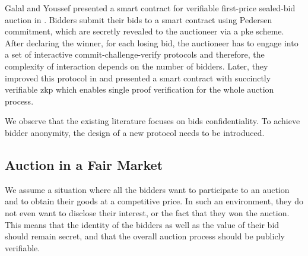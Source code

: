 
Galal and Youssef presented a smart contract for verifiable first-price sealed-bid auction in \cite{galal2018verifiable}. Bidders submit their bids to a smart contract using Pedersen commitment, which are secretly revealed to the auctioneer via a \gls{pke} scheme. After declaring the winner, for each losing bid, the auctioneer has to engage into a set of interactive commit-challenge-verify protocols and therefore, the complexity of interaction depends on the number of bidders. Later, they improved this protocol in \cite{galal2018succinctly} and presented a smart contract with succinctly verifiable \gls{zkp} which enables single proof verification for the whole auction process.


We observe that the existing literature focuses on bids confidentiality. To achieve bidder anonymity, the design of a new protocol needs to be introduced.

\subsection{Auction in a Fair Market}%
\label{subsec-usecase}%

We assume a situation where all the bidders want to participate to an auction and to obtain their goods at a competitive price. In such an environment, they do not even want to disclose their interest, or the fact that they won the auction. This means that the identity of the bidders as well as the value of their bid should remain secret, and that the overall auction process should be publicly verifiable.

